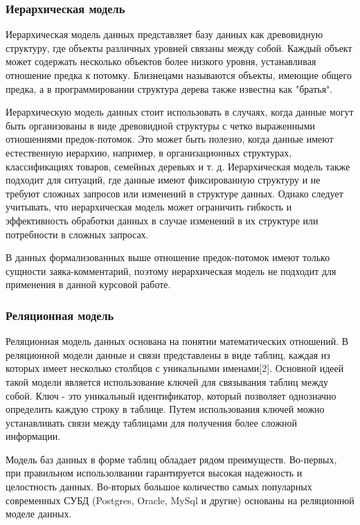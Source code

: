 \subsubsection{Иерархическая модель}

Иерархическая модель данных представляет базу данных как древовидную структуру, где объекты различных уровней связаны между собой. Каждый объект может содержать несколько объектов более низкого уровня, устанавливая отношение предка к потомку. Близнецами называются объекты, имеющие общего предка, а в программировании структура дерева также известна как "братья".

Иерархическую модель данных стоит использовать в случаях, когда данные могут быть организованы в виде древовидной структуры с четко выраженными отношениями предок-потомок. Это может быть полезно, когда данные имеют естественную иерархию, например, в организационных структурах, классификациях товаров, семейных деревьях и т. д. Иерархическая модель также подходит для ситуаций, где данные имеют фиксированную структуру и не требуют сложных запросов или изменений в структуре данных. Однако следует учитывать, что иерархическая модель может ограничить гибкость и эффективность обработки данных в случае изменений в их структуре или потребности в сложных запросах. 

В данных формализованных выше отношение предок-потомок имеют только сущности заяка-комментарий, поэтому иерархическая модель не подходит для применения в данной курсовой работе.

\subsubsection{Реляционная модель}

Реляционная модель данных\cite{relational-database} основана на понятии математических отношений. В реляционной модели данные и связи представлены в виде таблиц, каждая из которых имеет несколько столбцов с уникальными именами[2]. Основной идеей такой модели является использование ключей для связывания таблиц между собой. Ключ - это уникальный идентификатор, который позволяет однозначно определить каждую строку в таблице. Путем использования ключей можно устанавливать связи между таблицами для получения более сложной информации.

Модель баз данных в форме таблиц обладает рядом преимуществ. Во-первых, при правильном использолвании гарантируется высокая надежность и целостность данных. Во-вторых большое количество самых популарных современных СУБД (Postgres, Oracle, MySql и другие) основаны на реляционной моделе данных.

